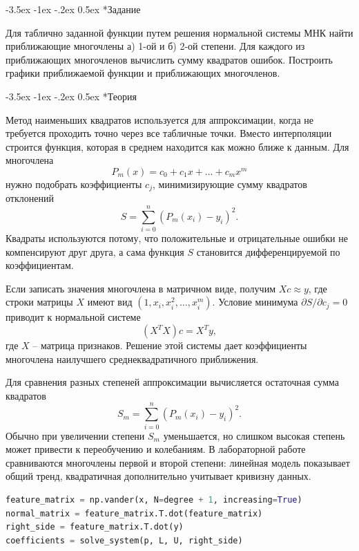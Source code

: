 \documentclass[14pt, a4paper]{article}
\makeatletter
\renewcommand\section{\@startsection {section}{1}{\parindent}%
  {-3.5ex \@plus -1ex \@minus -.2ex}%
  {0.5ex}%
  {\normalfont\Large\bfseries}}
\makeatother
\begin{document}
\section*{Задание}
Для таблично заданной функции путем решения нормальной системы МНК найти приближающие многочлены а) 1-ой и б) 2-ой степени. Для каждого из приближающих многочленов вычислить сумму квадратов ошибок. Построить графики приближаемой функции и приближающих многочленов.

\section*{Теория}
Метод наименьших квадратов используется для аппроксимации, когда не требуется проходить точно через все табличные точки. Вместо интерполяции строится функция, которая в среднем находится как можно ближе к данным. Для многочлена
\[
    P_m(x)=c_0+c_1x+\ldots+c_mx^m
\]
нужно подобрать коэффициенты $c_j$, минимизирующие сумму квадратов отклонений
\[
    S=\sum_{i=0}^n (P_m(x_i)-y_i)^2.
\]
Квадраты используются потому, что положительные и отрицательные ошибки не компенсируют друг друга, а сама функция $S$ становится дифференцируемой по коэффициентам.

Если записать значения многочлена в матричном виде, получим $Xc\approx y$, где строки матрицы $X$ имеют вид $(1,x_i,x_i^2,\ldots,x_i^m)$. Условие минимума $\partial S/\partial c_j=0$ приводит к нормальной системе
\[
    (X^TX)c=X^Ty,
\]
где $X$ -- матрица признаков. Решение этой системы дает коэффициенты многочлена наилучшего среднеквадратичного приближения.

Для сравнения разных степеней аппроксимации вычисляется остаточная сумма квадратов
\[
    S_m=\sum_{i=0}^n(P_m(x_i)-y_i)^2.
\]
Обычно при увеличении степени $S_m$ уменьшается, но слишком высокая степень может привести к переобучению и колебаниям. В лабораторной работе сравниваются многочлены первой и второй степени: линейная модель показывает общий тренд, квадратичная дополнительно учитывает кривизну данных.

\begin{lstlisting}[language=Python]
feature_matrix = np.vander(x, N=degree + 1, increasing=True)
normal_matrix = feature_matrix.T.dot(feature_matrix)
right_side = feature_matrix.T.dot(y)
coefficients = solve_system(p, L, U, right_side)
\end{lstlisting}
\end{document}
